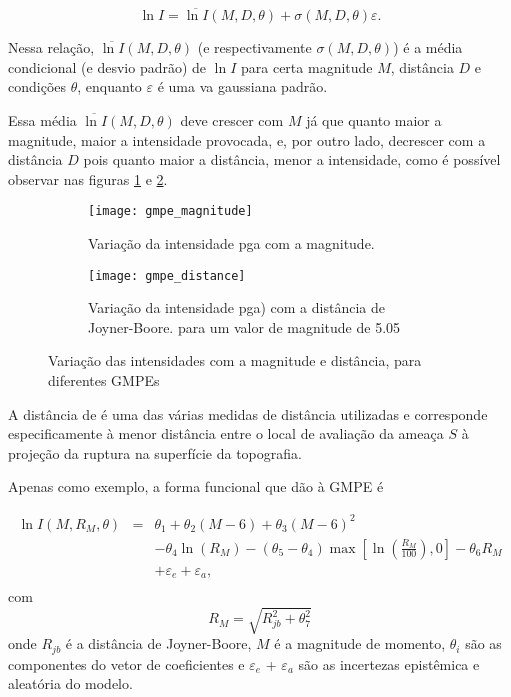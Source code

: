 \begin{equation} \label{pgamodel}
\ln I = \overline{\ln I}(M, D, \theta) + \sigma(M, D, \theta) \varepsilon.
\end{equation}

Nessa relação, $\overline{\ln I}(M, D, \theta)$ (e respectivamente $\sigma(M, D, \theta)$) 
é a média condicional (e desvio padrão) de $\ln I$ para certa magnitude $M$, distância $D$
e condições $\theta$, enquanto $\varepsilon$ é uma \gls{va} gaussiana padrão.

Essa média $\overline{\ln I}(M, D, \theta)$ deve crescer com $M$ já que quanto maior a magnitude,
maior a intensidade provocada, e, por outro lado, decrescer com a distância $D$ pois quanto maior a distância, menor
a intensidade, como é possível observar nas figuras \ref{fig:gmpe_magnitude} e \ref{fig:gmpe_distance}.

\begin{figure}[H]
	\centering
	\begin{subfigure}[t]{0.47\textwidth}
		\centering
		\texttt{[image: gmpe\_magnitude]} 
		\caption{Variação da intensidade \gls{pga} com a magnitude.}
		\label{fig:gmpe_magnitude} 
	\end{subfigure}
	\quad
	\begin{subfigure}[t]{0.47\textwidth}
		\centering
		\texttt{[image: gmpe\_distance]} 
		\caption{Variação da intensidade \gls{pga}) com a distância de Joyner-Boore.
		  para um valor de magnitude de 5.05 }
		\label{fig:gmpe_distance} 
	\end{subfigure}
	\caption{Variação das intensidades com a magnitude e distância, para diferentes GMPEs}
	\label{fig:gmpe} 
\end{figure}

A distância de \citet{joyner_1981} é uma das várias medidas de distância utilizadas e corresponde especificamente à
menor distância entre o local de avaliação da ameaça $S$ à projeção da ruptura na superfície da topografia. 

Apenas como exemplo, a forma funcional que \citet{toro_1997} dão à GMPE é

\begin{equation}
\begin{array}{lcl}
\ln I(M, R_M, \theta) 
&=& \theta_1 + \theta_2(M-6) + \theta_3(M-6)^2  \\
& & - \theta_4\ln (R_M) -(\theta_5 - \theta_4)\max\left[ \ln\left( \frac{R_M}{100} \right), 0 \right] -\theta_6 R_M \\
& & + \varepsilon_e + \varepsilon_a, \\
\end{array}
\end{equation}
com 
$$
R_M =  \sqrt{ R_{jb}^2 + \theta_7^2 }
$$
onde $R_{jb}$ é a distância de Joyner-Boore, $M$ é a magnitude de momento,
$\theta_i$ são as componentes do vetor de coeficientes e $\varepsilon_e$ + $\varepsilon_a$
são as incertezas epistêmica e aleatória do modelo.

